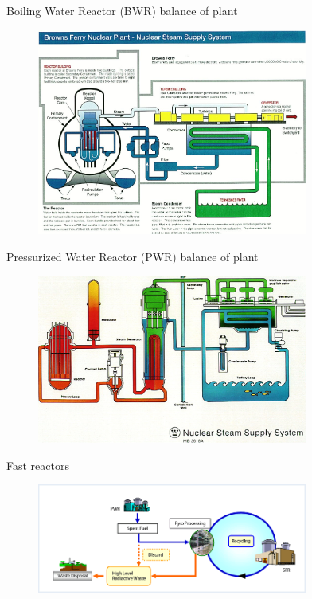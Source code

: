 \documentclass{beamer}
\begin{document}
    \begin{frame}{Boiling Water Reactor (BWR) balance of plant}
        \begin{figure}
            \centering
            \includegraphics[width=24em]{./img/bwrBop.png}
            \caption*{}
        \end{figure}
    \end{frame}

    \begin{frame}{Pressurized Water Reactor (PWR) balance of plant}
        \begin{figure}
            \centering
            \includegraphics[width=24em]{./img/pwrBop.png}
            \caption*{}
        \end{figure}
    \end{frame}

    \begin{frame}{Fast reactors}
        \begin{figure}
            \centering
            \includegraphics[width=24em]{./img/fastCycle.png}
            \caption*{}
        \end{figure}
    \end{frame}
\end{document}
